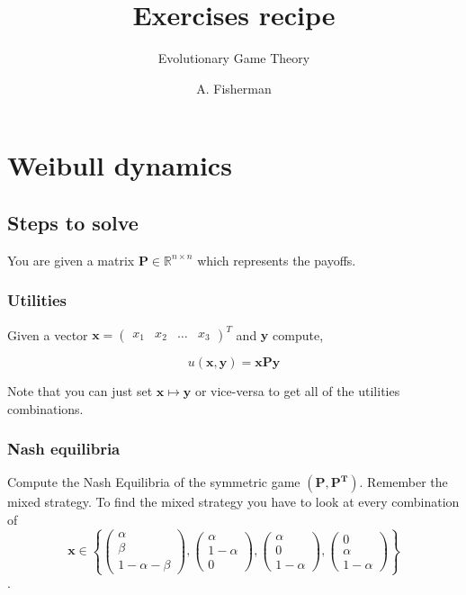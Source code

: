 \documentclass[american]{scrartcl}
\title{Exercises recipe}
\subtitle{Evolutionary Game Theory}
\author{A. Fisherman}
\newcommand{\Real}{\mathbb{R}}
\begin{document}
\maketitle

\section{Weibull dynamics}

\subsection{Steps to solve}

You are given a matrix $\bm{P} \in \Real^{n\times n}$ which represents the payoffs.

\subsubsection{Utilities}

Given a vector $\bm{x} = \begin{pmatrix}
        x_1 & x_2 & \ldots & x_3
    \end{pmatrix}^T$ and $\bm{y}$ compute,

\begin{equation}
    u(\bm{x}, \bm{y}) = \bm{x} \bm{P} \bm{y}
\end{equation}

Note that you can just set $\bm{x} \mapsto \bm{y}$ or vice-versa to get all of the utilities combinations.

\subsubsection{Nash equilibria}

Compute the Nash Equilibria of the symmetric game $(\bm{P}, \bm{P^T})$. Remember the mixed strategy. To find the mixed strategy you have to look at every combination of
\begin{equation}
    \bm{x} \in \left\{ \begin{pmatrix}
        \alpha \\ \beta \\ 1 - \alpha - \beta
    \end{pmatrix}, \begin{pmatrix}
        \alpha \\ 1 - \alpha \\ 0
    \end{pmatrix}, \begin{pmatrix}
        \alpha \\ 0 \\ 1 - \alpha
    \end{pmatrix}, \begin{pmatrix}
        0 \\ \alpha \\ 1 - \alpha
    \end{pmatrix} \right\}
\end{equation}.
\end{document}
